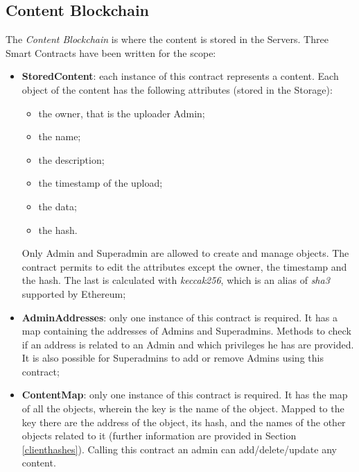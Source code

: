 \documentclass[conference,compsoc]{IEEEtran}
\begin{document}
\subsection{Content Blockchain}
The \textit{Content Blockchain} is where the content is stored in the Servers. Three Smart Contracts have been written for the scope:
\begin{itemize}
	\item \textbf{StoredContent}: each instance of this contract represents a content. Each object of the content has the following attributes (stored in the Storage): 
	\begin{itemize}
		\item the owner, that is the uploader Admin;
		\item the name;
		\item the description;
		\item the timestamp of the upload;
		\item the data;
		\item the hash.
	\end{itemize}
	Only Admin and Superadmin are allowed to create and manage objects. The contract permits to edit the attributes except the owner, the timestamp and the hash. The last is calculated with \textit{keccak256}, which is an alias of \textit{sha3} supported by Ethereum;
	\item \textbf{AdminAddresses}: only one instance of this contract is required. It has a map containing the addresses of Admins and Superadmins. Methods to check if an address is related to an Admin and which privileges he has are provided. It is also possible for Superadmins to add or remove Admins using this contract;
	\item \textbf{ContentMap}: only one instance of this contract is required. It has the map of all the objects, wherein the key is the name of the object. Mapped to the key there are the address of the object, its hash, and the names of the other objects related to it (further information are provided in Section \ref{clienthashes}). Calling this contract an admin can add/delete/update any content.
	
\end{itemize}
\end{document}
